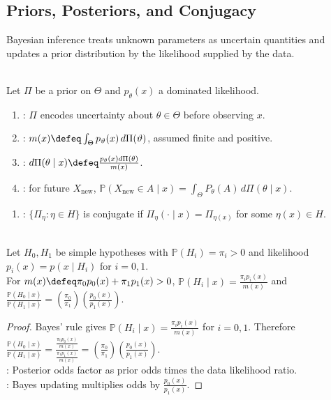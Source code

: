 \subsection{Priors, Posteriors, and Conjugacy}

Bayesian inference treats unknown parameters as uncertain quantities and updates a prior distribution by the likelihood supplied by the data.

\begin{definition} \label{def:prior-posterior-predictive} \\
Let $\Pi$ be a prior on $\Theta$ and $p_\theta(x)$ a dominated likelihood.
\begin{enumerate}[label=(\roman*)]
\setlength{\itemsep}{0pt}
\item {}: $\Pi$ encodes uncertainty about $\theta\in\Theta$ before observing $x$.
\item {}: $m(x)\defeq\int_\Theta p_\vartheta(x)\,d\Pi(\vartheta)$, assumed finite and positive.
\item {}: $d\Pi(\theta\mid x)\defeq \frac{p_\theta(x)d\Pi(\theta)}{m(x)}$.
\item {}: for future $X_{\mathrm{new}}$, $\mathbb{P}(X_{\mathrm{new}}\in A\mid x)=\int_\Theta P_\theta(A)\,d\Pi(\theta\mid x)$.
\end{enumerate}
\end{definition}

\begin{definition} \label{def:conjugate-prior-family} 
\begin{enumerate}[label=(\roman*)]
\setlength{\itemsep}{0pt}
\item {}: $\{\Pi_\eta:\eta\in H\}$ is conjugate if $\Pi_\eta(\cdot\mid x)=\Pi_{\eta(x)}$ for some $\eta(x)\in H$.
\end{enumerate}
\end{definition}

\begin{proposition} \label{prop:posterior-odds-likelihood-ratio} \\
Let $H_0,H_1$ be simple hypotheses with $\mathbb{P}(H_i)=\pi_i>0$ and likelihood $p_i(x)=p(x\mid H_i)$ for $i=0,1$.\\
For $m(x)\defeq\pi_0p_0(x)+\pi_1p_1(x)>0$, $\mathbb{P}(H_i\mid x)=\frac{\pi_ip_i(x)}{m(x)}$ and $\frac{\mathbb{P}(H_0\mid x)}{\mathbb{P}(H_1\mid x)}=(\frac{\pi_0}{\pi_1})(\frac{p_0(x)}{p_1(x)})$.
\begin{proof}
Bayes' rule gives $\mathbb{P}(H_i\mid x)=\frac{\pi_ip_i(x)}{m(x)}$ for $i=0,1$. Therefore $\frac{\mathbb{P}(H_0\mid x)}{\mathbb{P}(H_1\mid x)}=\frac{\frac{\pi_0p_0(x)}{m(x)}}{\frac{\pi_1p_1(x)}{m(x)}}=(\frac{\pi_0}{\pi_1})(\frac{p_0(x)}{p_1(x)})$.\\
: Posterior odds factor as prior odds times the data likelihood ratio.\\
: Bayes updating multiplies odds by $\frac{p_0(x)}{p_1(x)}$.
\end{proof}
\end{proposition}

